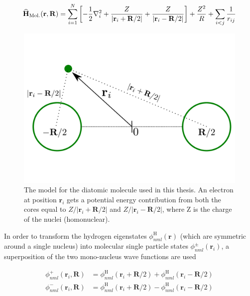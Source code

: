 \begin{equation}
 {\bf\widehat{H}}_{\mathrm{Mol.}}(\mathbf{r}, \mathbf{R}) = \sum_{i=1}^N \left[-\frac{1}{2}\nabla_i^2 + \frac{Z}{|\mathbf{r}_i + \mathbf{R}/2|} + \frac{Z}{|\mathbf{r}_i - \mathbf{R}/2|}\right] + \frac{Z^2}{R} + \sum_{i<j} \frac{1}{r_{ij}}
\end{equation}



\begin{figure}
 \begin{center}
  \includegraphics[scale=0.3]{../Graphics/Molecules.pdf}
  \caption{The model for the diatomic molecule used in this thesis. An electron at position $\mathbf{r}_i$ gets a potential energy contribution from both the cores equal to $Z/|\mathbf{r}_i + \mathbf{R}/2|$ and  $Z/|\mathbf{r}_i - \mathbf{R}/2|$, where Z is the charge of the nuclei (homonuclear).}
  \label{fig:dimolecules}
 \end{center}
\end{figure}


In order to transform the hydrogen eigenstates $\phi_{nml}^\mathrm{H}(\mathbf{r})$ (which are symmetric around a single nucleus) into molecular single particle states $\phi_{nml}^\pm (\mathbf{r}_i)$, a superposition of the two mono-nucleus wave functions are used

\begin{align}
 \phi_{nml}^+ (\mathbf{r}_i, \mathbf{R}) &= \phi_{nml}^\mathrm{H}(\mathbf{r}_i + \mathbf{R}/2) + \phi_{nml}^\mathrm{H}(\mathbf{r}_i - \mathbf{R}/2)\label{eq:moleculeTransPlus} \\
 \phi_{nml}^- (\mathbf{r}_i, \mathbf{R}) &= \phi_{nml}^\mathrm{H}(\mathbf{r}_i + \mathbf{R}/2) - \phi_{nml}^\mathrm{H}(\mathbf{r}_i - \mathbf{R}/2)\label{eq:moleculeTransMin}
\end{align}

